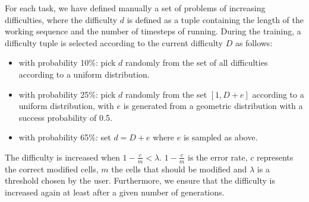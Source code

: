 For each task, we have defined manually a set of problems of increasing difficulties, where the difficulty $d$ is defined as a tuple containing the length of the working sequence and the number of timesteps of running. During the training, a difficulty tuple is selected according to the current difficulty $D$ as follows:
\begin{itemize}
	\item{with probability 10\%: pick $d$ randomly from the set of all difficulties according to a uniform distribution.}
	\item{with probability 25\%: pick $d$ randomly from the set $[1, D + e]$ according to a uniform distribution, with $e$ is generated from a geometric distribution with a success probability of 0.5.}
	\item{with probability 65\%: set $d = D + e$ where $e$ is sampled as above.}
\end{itemize}
The difficulty is increased when $1 - \frac{c}{m} < \lambda$. $1 - \frac{c}{m}$ is the error rate, $c$ represents the correct modified cells, $m$ the cells that should be modified and $\lambda$ is a threshold chosen by the user. Furthermore, we ensure that the difficulty is increased again at least after a given number of generations.



